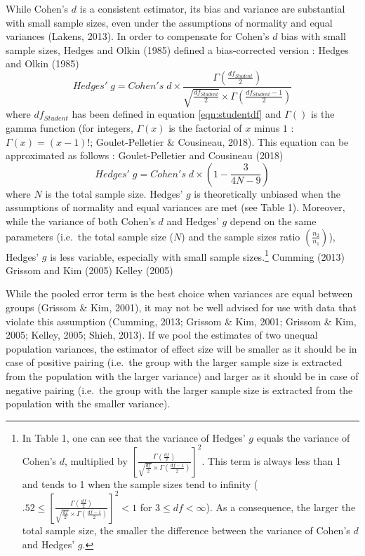 \documentclass[
  english,
  man,floatsintext]{apa6}
\begin{document}
While Cohen's \(d\) is a consistent estimator, its bias and variance are substantial with small sample sizes, even under the assumptions of normality and equal variances (Lakens, 2013). In order to compensate for Cohen's \(d\) bias with small sample sizes, Hedges and Olkin (1985) defined a bias-corrected version : \color{white} Hedges and Olkin (1985) \color{black}
\begin{equation*} 
Hedges' \; g = Cohen's \; d \times \frac{\Gamma(\frac{df_{Student}}{2})}{\sqrt{\frac{df_{Student}}{2}} \times \Gamma(\frac{df_{Student}-1}{2})}
\label{eqn:Hedgesgs}
\end{equation*}
where \(df_{Student}\) has been defined in equation \ref{eqn:studentdf} and \(\Gamma()\) is the gamma function (for integers, \(\Gamma(x)\) is the factorial of \(x\) minus \(1\) : \(\Gamma(x)=(x-1)!\); Goulet-Pelletier \(\&\) Cousineau, 2018). This equation can be approximated as follows : \color{white} Goulet-Pelletier and Cousineau (2018) \color{black}
\begin{equation*} 
Hedges' \; g = Cohen's \; d \times \left( 1- \frac{3}{4N -9} \right)
\label{eqn:Hedgesgsapprox}
\end{equation*}
where \(N\) is the total sample size. Hedges' \(g\) is theoretically unbiased when the assumptions of normality and equal variances are met (see Table 1). Moreover, while the variance of both Cohen's \(d\) and Hedges' \(g\) depend on the same parameters (i.e.~the total sample size (\(N\)) and the sample sizes ratio \(\left(\frac{n_2}{n_1}\right)\)), Hedges' \(g\) is less variable, especially with small sample sizes.\footnote{In Table 1, one can see that the variance of Hedges' $g$ equals the variance of Cohen's $d$, multiplied by $\left[\frac{\Gamma(\frac{df}{2})}{\sqrt{\frac{df}{2}} \times \Gamma(\frac{df-1}{2})} \right] ^2$. This term is always less than 1 and tends to 1 when the sample sizes tend to infinity ($.52 \le \left[\frac{\Gamma(\frac{df}{2})}{\sqrt{\frac{df}{2}} \times \Gamma(\frac{df-1}{2})} \right] ^2 < 1$ for $3 \le df < \infty$). As a consequence, the larger the total sample size, the smaller the difference between the variance of Cohen's $d$ and Hedges' $g$.} \color{white} Cumming (2013) Grissom and Kim (2005) Kelley (2005)\color{black}

While the pooled error term is the best choice when variances are equal between groups (Grissom \& Kim, 2001), it may not be well advised for use with data that violate this assumption (Cumming, 2013; Grissom \& Kim, 2001; Grissom \& Kim, 2005; Kelley, 2005; Shieh, 2013). If we pool the estimates of two unequal population variances, the estimator of effect size will be smaller as it should be in case of positive pairing (i.e.~the group with the larger sample size is extracted from the population with the larger variance) and larger as it should be in case of negative pairing (i.e.~the group with the larger sample size is extracted from the population with the smaller variance).
\end{document}
